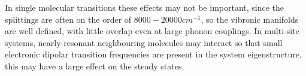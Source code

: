\documentclass[]{article}
\begin{document}
In single molecular transitions these effects may not be important, since the splittings are often on the order of $8000-20000 cm^{-1}$, so the vibronic manifolds are well defined, with little overlap even at large phonon couplings. In multi-site systems, nearly-resonant neighbouring molecules may interact so that small electronic dipolar transition frequencies are present in the system eigenstructure, this may have a large effect on the steady states.
\begin{comment}
\begin{figure}[h]
	\centering
	\texttt{[image: "/Users/henrymaguire/Work/phd-work/vibronic-TLS/Notes/Images/Checks/Pop\_SS\_divergence\_a300\_Tem6000\_w0300\_eps2000".pdf]}
	\caption{Steady-state excited state population as a function of TLS splitting where $\alpha_{ph}=300$, $T_{EM} =6000$, $\omega_0 = 300$}
	\label{fig:steadyStatevsSplitting}
\end{figure}


\subsection{Underdamped Lorentzian Spectral Density (Localised vibrations)}
\begin{itemize}
	\item Large splitting, everything converges.
	\item As splitting decreases, the NS and S start to diverge from the naive. NS and S remain close until very small splitting, at which point the NS appears to return towards agreement with naive.
\end{itemize}

For moderate splitting and an underdamped phonon spectral density, the excited and ground states vibronic manifolds are well separated, see figures \ref{fig:manifold_weakcoupling}-\ref{fig:manifold_strongsmallsplitting}. This means that the dynamics are well approximated by the naive, electronic Lindblad theory of dissipation. However, if the electronic splitting becomes sufficiently small then the two manifolds can overlap and we start to observe the complex behaviour seen in the overdamped case. This happens at a much smaller splitting size since the ladder spacing of the vibronic states is so much smaller.

\begin{itemize}
	\item Is this occurring because the system is so far off resonance with the vibrations? (Reducing the splitting so it is closer to the peak of the spectral density indeed means vibronic theories diverge from the naive.)
\end{itemize}


\end{comment}
\end{document}
